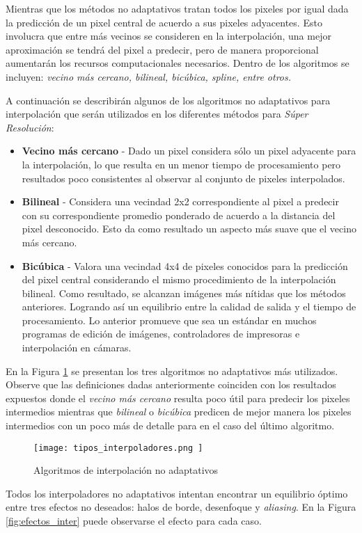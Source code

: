 Mientras que los métodos no adaptativos tratan todos los pixeles por igual
dada la predicción de un pixel central de acuerdo a sus pixeles adyacentes. Esto 
involucra que entre más vecinos se consideren en la interpolación, una mejor 
aproximación se tendrá del pixel a predecir, pero de manera proporcional 
aumentarán los recursos computacionales necesarios. Dentro de los algoritmos 
se incluyen: \emph{vecino más cercano, bilineal, bicúbica, spline, entre otros.}

A continuación se describirán algunos de los algoritmos no adaptativos para 
interpolación que serán utilizados en los diferentes métodos para \emph{Súper
Resolución}:
\begin{itemize}
    \item \textbf{Vecino más cercano} - Dado un pixel considera sólo un pixel 
    adyacente para la interpolación, lo que resulta en un menor tiempo de procesamiento
    pero resultados poco consistentes al observar al conjunto de pixeles interpolados. 
    \item \textbf{Bilineal} - Considera una vecindad 2x2 correspondiente al pixel
    a predecir con su correspondiente promedio ponderado de acuerdo a la distancia
    del pixel desconocido. Esto da como resultado un aspecto más suave que el vecino
    más cercano. 
    \item \textbf{Bicúbica} - Valora una vecindad 4x4 de pixeles conocidos para la
    predicción del pixel central considerando el mismo procedimiento de la 
    interpolación bilineal. Como resultado, se alcanzan imágenes más nítidas que los 
    métodos anteriores. Logrando así un equilibrio entre la calidad de salida y el 
    tiempo de procesamiento. Lo anterior promueve que sea un estándar en muchos programas
    de edición de imágenes, controladores de impresoras e interpolación en cámaras. 
\end{itemize}

En la Figura \ref{fig:interpoladores} se presentan los tres algoritmos no adaptativos
más utilizados. Observe que las definiciones dadas anteriormente coinciden con los 
resultados expuestos donde el \emph{vecino más cercano} resulta poco útil para
predecir los pixeles intermedios mientras que \emph{bilineal} o \emph{bicúbica}
predicen de mejor manera los pixeles intermedios con un poco más de detalle para
en el caso del último algoritmo. 
 
\begin{figure}[H]
    \texttt{[image:  tipos\_interpoladores.png ]}
    \centering
    \caption{ Algoritmos de interpolación no adaptativos }
    \label{fig:interpoladores}
\end{figure}
Todos los interpoladores no adaptativos intentan encontrar un equilibrio óptimo
entre tres efectos no deseados: halos de borde, desenfoque y \emph{aliasing}. En la 
Figura \ref{fig:efectos_inter} puede observarse el efecto para cada caso. 

